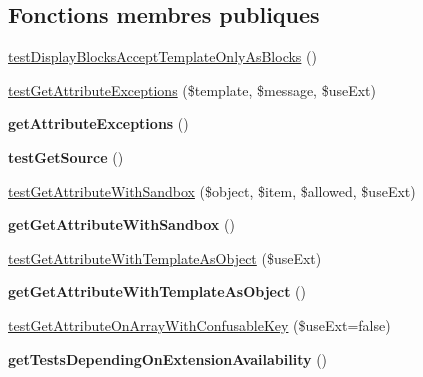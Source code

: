 \subsection*{Fonctions membres publiques}
\begin{DoxyCompactItemize}
\item 
\hyperlink{class_twig___tests___template_test_a22652032076fde4ad5a45d1e6acf08c9}{test\+Display\+Blocks\+Accept\+Template\+Only\+As\+Blocks} ()
\item 
\hyperlink{class_twig___tests___template_test_aecc5ba6bd54adc2bb58659ff1bb4e60a}{test\+Get\+Attribute\+Exceptions} (\$template, \$message, \$use\+Ext)
\item 
{\bfseries get\+Attribute\+Exceptions} ()\hypertarget{class_twig___tests___template_test_ab371e88b7ed7a9ef4f9f3638a5362ef7}{}\label{class_twig___tests___template_test_ab371e88b7ed7a9ef4f9f3638a5362ef7}

\item 
{\bfseries test\+Get\+Source} ()\hypertarget{class_twig___tests___template_test_a3881ac59db6e56947aea2ef1e9d40aef}{}\label{class_twig___tests___template_test_a3881ac59db6e56947aea2ef1e9d40aef}

\item 
\hyperlink{class_twig___tests___template_test_a2f14b7dd86b3e7201509fe0138af5611}{test\+Get\+Attribute\+With\+Sandbox} (\$object, \$item, \$allowed, \$use\+Ext)
\item 
{\bfseries get\+Get\+Attribute\+With\+Sandbox} ()\hypertarget{class_twig___tests___template_test_adeba74fe3c2247c686cb0ea89353fc76}{}\label{class_twig___tests___template_test_adeba74fe3c2247c686cb0ea89353fc76}

\item 
\hyperlink{class_twig___tests___template_test_ade2be5272c603ff4436774df80f222a6}{test\+Get\+Attribute\+With\+Template\+As\+Object} (\$use\+Ext)
\item 
{\bfseries get\+Get\+Attribute\+With\+Template\+As\+Object} ()\hypertarget{class_twig___tests___template_test_ab1e13902f5eb196616c3fb1e68175048}{}\label{class_twig___tests___template_test_ab1e13902f5eb196616c3fb1e68175048}

\item 
\hyperlink{class_twig___tests___template_test_a91402f8ec44470d22355bb7aa707569f}{test\+Get\+Attribute\+On\+Array\+With\+Confusable\+Key} (\$use\+Ext=false)
\item 
{\bfseries get\+Tests\+Depending\+On\+Extension\+Availability} ()\hypertarget{class_twig___tests___template_test_a9952d8f34aa1b6bd65cb30f603a58de3}{}\label{class_twig___tests___template_test_a9952d8f34aa1b6bd65cb30f603a58de3}


\end{DoxyCompactItemize}

